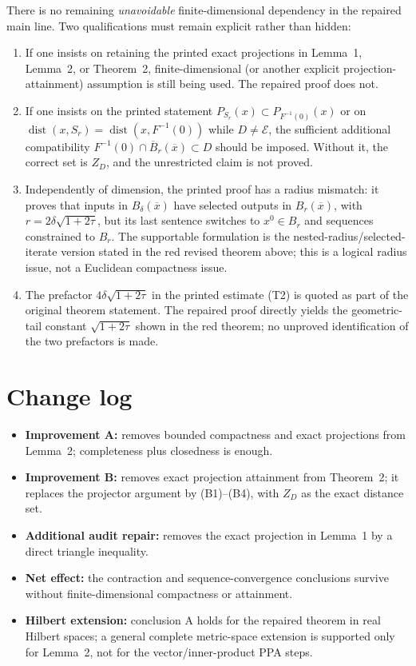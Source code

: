 \documentclass[11pt]{article}
\newcommand{\E}{\mathcal E}
\newcommand{\dist}{\operatorname{dist}}
\newcommand{\barx}{\overline{x}}
\begin{document}
There is no remaining \emph{unavoidable} finite-dimensional dependency in the repaired main line. Two qualifications must remain explicit rather than hidden:
\begin{enumerate}
\item If one insists on retaining the printed exact projections in Lemma~1, Lemma~2, or Theorem~2, finite-dimensional (or another explicit projection-attainment) assumption is still being used. The repaired proof does not.
\item If one insists on the printed statement \(P_{S_r}(x)\subset P_{F^{-1}(0)}(x)\) or on \(\dist(x,S_r)=\dist(x,F^{-1}(0))\) while \(D\ne\E\), the sufficient additional compatibility \(F^{-1}(0)\cap\overline B_r(\barx)\subset D\) should be imposed. Without it, the correct set is \(Z_D\), and the unrestricted claim is not proved.
\item Independently of dimension, the printed proof has a radius mismatch: it proves that inputs in \(B_\delta(\barx)\) have selected outputs in \(B_r(\barx)\), with \(r=2\delta\sqrt{1+2\tau}\), but its last sentence switches to \(x^0\in B_r\) and sequences constrained to \(B_r\). The supportable formulation is the nested-radius/selected-iterate version stated in the red revised theorem above; this is a logical radius issue, not a Euclidean compactness issue.
\item The prefactor \(4\delta\sqrt{1+2\tau}\) in the printed estimate (T2) is quoted as part of the original theorem statement. The repaired proof directly yields the geometric-tail constant \(\sqrt{1+2\tau}\) shown in the red theorem; no unproved identification of the two prefactors is made.
\end{enumerate}

\section*{Change log}

\begin{itemize}
\item \textbf{Improvement A:} removes bounded compactness and exact projections from Lemma~2; completeness plus closedness is enough.
\item \textbf{Improvement B:} removes exact projection attainment from Theorem~2; it replaces the projector argument by (B1)--(B4), with \(Z_D\) as the exact distance set.
\item \textbf{Additional audit repair:} removes the exact projection in Lemma~1 by a direct triangle inequality.
\item \textbf{Net effect:} the contraction and sequence-convergence conclusions survive without finite-dimensional compactness or attainment.
\item \textbf{Hilbert extension:} conclusion A holds for the repaired theorem in real Hilbert spaces; a general complete metric-space extension is supported only for Lemma~2, not for the vector/inner-product PPA steps.
\end{itemize}
\end{document}
